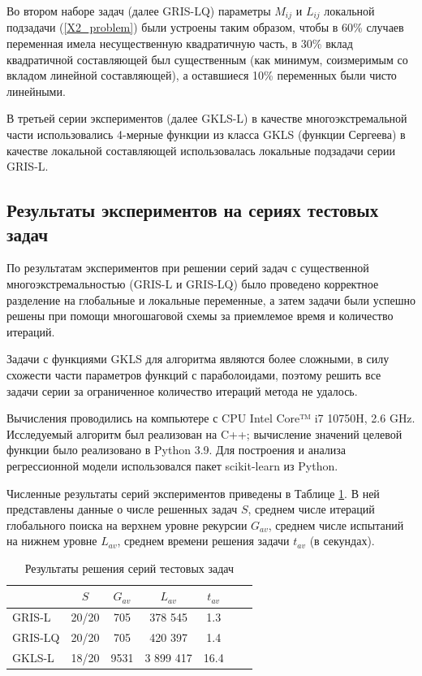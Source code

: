 \documentclass[11pt, oneside, a4paper]{article}
\begin{document}
Во втором наборе задач (далее GRIS-LQ) параметры $M_{ij}$ и $L_{ij}$ локальной подзадачи (\ref{X2_problem}) были устроены таким образом, чтобы в 60\% случаев переменная имела несущественную квадратичную часть, в 30\% вклад квадратичной составляющей был существенным (как минимум, соизмеримым со вкладом линейной составляющей), а оставшиеся 10\% переменных были чисто линейными.

В третьей серии экспериментов (далее GKLS-L) в качестве многоэкстремальной части использовались 4-мерные функции из класса GKLS (функции Сергеева) \cite{Sergeyev2013} в качестве локальной составляющей использовалась локальные подзадачи серии GRIS-L.

\subsection{Результаты экспериментов на сериях тестовых задач}

По результатам экспериментов при решении серий задач с существенной многоэкстремальностью (GRIS-L и GRIS-LQ) было проведено корректное разделение на глобальные и локальные переменные, а затем задачи были успешно решены при помощи многошаговой схемы за приемлемое время и количество итераций.

Задачи с функциями GKLS для алгоритма являются более сложными, в силу схожести части параметров функций с параболоидами, поэтому решить все задачи серии за ограниченное количество итераций метода не удалось.

Вычисления проводились на компьютере с CPU Intel Core™ i7 10750H, 2.6 GHz. Исследуемый алгоритм был реализован на C++; вычисление значений целевой функции было реализовано в Python 3.9. Для построения и анализа регрессионной модели использовался пакет scikit-learn из Python.

Численные результаты серий экспериментов приведены в Таблице \ref{tab1}. В ней представлены данные о числе решенных задач $S$, среднем числе итераций глобального поиска на верхнем уровне рекурсии $G_{av}$, среднем числе испытаний на нижнем уровне $L_{av}$, среднем времени решения задачи $t_{av}$ (в секундах).

\begin{table}[ht]
	\caption{Результаты решения серий тестовых задач}
	\label{tab1}
	\begin{center}
		\begin{tabular}{ l c c c c c c } \hline
		 & $S$ &  $G_{av}$ &  $L_{av}$ & $t_{av}$ \\
    \hline
		GRIS-L & 20/20  & 705 &  378 545 & 1.3 \\
		GRIS-LQ & 20/20 & 705 &  420 397 & 1.4 \\
		GKLS-L & 18/20 & 9531 &  3 899 417 & 16.4 \\
		\hline
		\end{tabular}
	\end{center}
\end{table}
\end{document}
